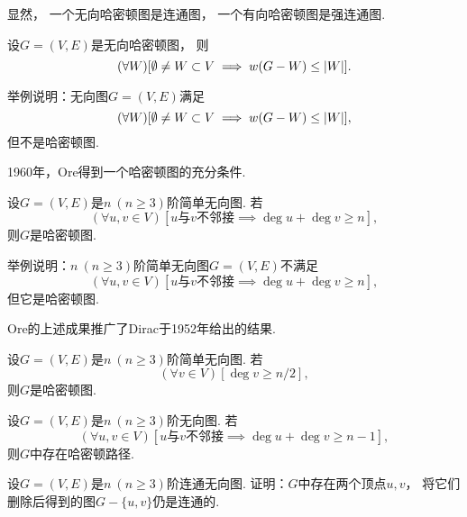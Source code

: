 显然，
一个无向哈密顿图是连通图，
一个有向哈密顿图是强连通图.

\begin{theorem}
设\(G = (V,E)\)是无向哈密顿图，
则\[
	(\forall W)
	[
		\emptyset \neq W \subset V
		\implies
		w(G-W) \leq \abs{W}
	].
\]
\end{theorem}

\begin{example}
举例说明：无向图\(G = (V,E)\)满足\[
	(\forall W)
	[
		\emptyset \neq W \subset V
		\implies
		w(G-W) \leq \abs{W}
	],
\]
但不是哈密顿图.
\end{example}

1960年，Ore得到一个哈密顿图的充分条件.
\begin{theorem}
设\(G = (V,E)\)是\(n\ (n\geq3)\)阶简单无向图.
若\[
	(\forall u,v \in V)
	\left[
		\text{$u$与$v$不邻接}
		\implies
		\deg u + \deg v \geq n
	\right],
\]
则\(G\)是哈密顿图.
\end{theorem}

\begin{example}
举例说明：\(n\ (n\geq3)\)阶简单无向图\(G = (V,E)\)不满足\[
	(\forall u,v \in V)
	\left[
		\text{$u$与$v$不邻接}
		\implies
		\deg u + \deg v \geq n
	\right],
\]
但它是哈密顿图.
\end{example}

Ore的上述成果推广了Dirac于1952年给出的结果.
\begin{corollary}
设\(G = (V,E)\)是\(n\ (n\geq3)\)阶简单无向图.
若\[
	(\forall v \in V)
	[\deg v \geq n/2],
\]
则\(G\)是哈密顿图.
\end{corollary}

\begin{theorem}
设\(G = (V,E)\)是\(n\ (n\geq3)\)阶无向图.
若\[
	(\forall u,v \in V)
	\left[
		\text{$u$与$v$不邻接}
		\implies
		\deg u + \deg v \geq n-1
	\right],
\]
则\(G\)中存在哈密顿路径.
\end{theorem}

\begin{example}
设\(G = (V,E)\)是\(n\ (n\geq3)\)阶连通无向图.
证明：\(G\)中存在两个顶点\(u,v\)，
将它们删除后得到的图\(G-\{u,v\}\)仍是连通的.
\end{example}

